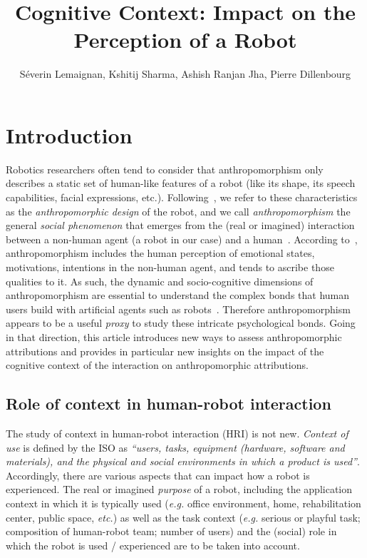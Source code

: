 \documentclass[lettersize, noapacite, twoside, HRI]{apa_HRI}
\title{Cognitive Context: Impact on the Perception of a Robot}
\author{S\'everin Lemaignan, Kshitij Sharma, Ashish Ranjan Jha, Pierre
Dillenbourg}
\affiliation{CHILI Lab, \'Ecole Polytechnique F\'ed\'erale de Lausanne}
\newcommand{\eg}{\textit{e.g.}\xspace}
\newcommand{\etc}{\textit{etc.}\xspace}
\begin{document}
\maketitle

\section{Introduction}

Robotics researchers often tend to consider that anthropomorphism only describes
a static set of human-like features of a robot (like its shape, its speech
capabilities, facial expressions, etc.).
Following~\citet{fink_anthropomorphism_2012}, we refer to these characteristics
as the \emph{anthropomorphic design} of the robot, and we call
\emph{anthropomorphism} the general \emph{social phenomenon} that emerges from
the (real or imagined) interaction between a non-human agent (a robot in our
case) and a human~\citep{persson_anthropomorphism_2000}.  According
to~\citet{epley_when_2008}, anthropomorphism includes the human perception of
emotional states, motivations, intentions in the non-human agent, and tends to
ascribe those qualities to it. As such, the dynamic and socio-cognitive
dimensions of anthropomorphism are essential to understand the complex bonds
that human users build with artificial agents such as
robots~\citep{lemaignan2014dynamics}. Therefore anthropomorphism appears to be a
useful \emph{proxy} to study these intricate psychological
bonds. Going in that direction, this article introduces new ways to assess
anthropomorphic attributions and provides in particular new insights on
the impact of the cognitive context of the interaction on anthropomorphic
attributions.

\subsection{Role of context in human-robot interaction}

The study of context in human-robot interaction (HRI) is not new.
\textit{Context of use} is defined by the ISO as \textit{``users, tasks,
equipment (hardware, software and materials), and the physical and social
environments in which a product is used''}.  Accordingly, there are various
aspects that can impact how a robot is experienced. The real or imagined
\textit{purpose} of a robot, including the application context in which it is
typically used (\eg office environment, home, rehabilitation center, public
space, \etc) as well as the task context (\eg serious or playful task;
composition of human-robot team; number of users) and the (social) role in which
the robot is used / experienced are to be taken into account.
\end{document}
